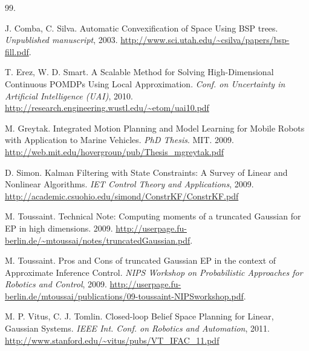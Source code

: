 \documentclass[letterpaper]{article}
\renewenvironment{thebibliography}[1]{%
  \begin{oldthebibliography}{#1}%
    \setlength{\parskip}{0ex}%
    \setlength{\itemsep}{0ex}%
}%
{%
  \end{oldthebibliography}%
}
\begin{document}
\begin{thebibliography}{99.}
 J. Comba, C. Silva. Automatic Convexification of Space Using BSP trees. \emph{Unpublished manuscript}, 2003. \url{http://www.sci.utah.edu/~csilva/papers/bsp-fill.pdf}.

 T. Erez, W. D. Smart. A Scalable Method for Solving High-Dimensional Continuous POMDPs Using Local Approximation. \emph{Conf. on Uncertainty in Artificial Intelligence (UAI)}, 2010. \url{http://research.engineering.wustl.edu/~etom/uai10.pdf}
    
 M. Greytak. Integrated Motion Planning and Model Learning for Mobile Robots with Application to Marine Vehicles. \emph{PhD Thesis}. MIT. 2009. \url{http://web.mit.edu/hovergroup/pub/Thesis_mgreytak.pdf}

 D. Simon. Kalman Filtering with State Constraints: A Survey of Linear and Nonlinear Algorithms. \emph{IET Control Theory and Applications}, 2009. \url{http://academic.csuohio.edu/simond/ConstrKF/ConstrKF.pdf}

 M. Toussaint. Technical Note: Computing moments of a truncated {G}aussian for {EP} in high dimensions. 2009. \url{http://userpage.fu-berlin.de/~mtoussai/notes/truncatedGaussian.pdf}.

 M. Toussaint. Pros and Cons of truncated {G}aussian {EP} in the context of {A}pproximate {I}nference {C}ontrol. \emph{NIPS Workshop on Probabilistic Approaches for Robotics and Control}, 2009. \url{http://userpage.fu-berlin.de/mtoussai/publications/09-toussaint-NIPSworkshop.pdf}.

 M. P. Vitus, C. J. Tomlin. Closed-loop Belief Space Planning for Linear, Gaussian Systems. \emph{IEEE Int. Conf. on Robotics and Automation}, 2011. \url{http://www.stanford.edu/~vitus/pubs/VT_IFAC_11.pdf}

\end{thebibliography}
\end{document}
